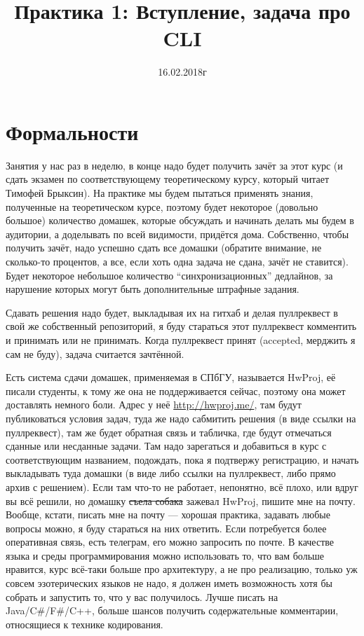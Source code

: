 \documentclass[a5paper]{article}
\title{Практика 1: Вступление, задача про CLI}
\date{16.02.2018г}
\begin{document}
\maketitle
\thispagestyle{empty}

\section{Формальности}
Занятия у нас раз в неделю, в конце надо будет получить зачёт за этот курс (и сдать экзамен по соответствующему теоретическому курсу, который читает Тимофей Брыксин). На практике мы будем пытаться применять знания, полученные на теоретическом курсе, поэтому будет некоторое (довольно большое) количество домашек, которые обсуждать и начинать делать мы будем в аудитории, а доделывать по всей видимости, придётся дома. Собственно, чтобы получить зачёт, надо успешно сдать все домашки (обратите внимание, не сколько-то процентов, а все, если хоть одна задача не сдана, зачёт не ставится). Будет некоторое небольшое количество ``синхронизационных'' дедлайнов, за нарушение которых могут быть дополнительные штрафные задания.

Сдавать решения надо будет, выкладывая их на гитхаб и делая пуллреквест в свой же собственный репозиторий, я буду стараться этот пуллреквест комментить и принимать или не принимать. Когда пуллреквест принят (accepted, мерджить я сам не буду), задача считается зачтённой.

Есть система сдачи домашек, применяемая в СПбГУ, называется HwProj, её писали студенты, к тому же она не поддерживается сейчас, поэтому она может доставлять немного боли. Адрес у неё \url{http://hwproj.me/}, там будут публиковаться условия задач, туда же надо сабмитить решения (в виде ссылки на пуллреквест), там же будет обратная связь и табличка, где будут отмечаться сданные или несданные задачи. Там надо зарегаться и добавиться в курс с соответствующим названием, подождать, пока я подтвержу регистрацию, и начать выкладывать туда домашки (в виде либо ссылки на пуллреквест, либо прямо архив с решением). Если там что-то не работает, непонятно, всё плохо, или вдруг вы всё решили, но домашку \sout{съела собака} зажевал HwProj, пишите мне на почту. Вообще, кстати, писать мне на почту --- хорошая практика, задавать любые вопросы можно, я буду стараться на них ответить. Если потребуется более оперативная связь, есть телеграм, его можно запросить по почте. В качестве языка и среды программирования можно использовать то, что вам больше нравится, курс всё-таки больше про архитектуру, а не про реализацию, только уж совсем эзотерических языков не надо, я должен иметь возможность хотя бы собрать и запустить то, что у вас получилось. Лучше писать на Java/C\#/F\#/C++, больше шансов получить содержательные комментарии, относящиеся к технике кодирования.
\end{document}
